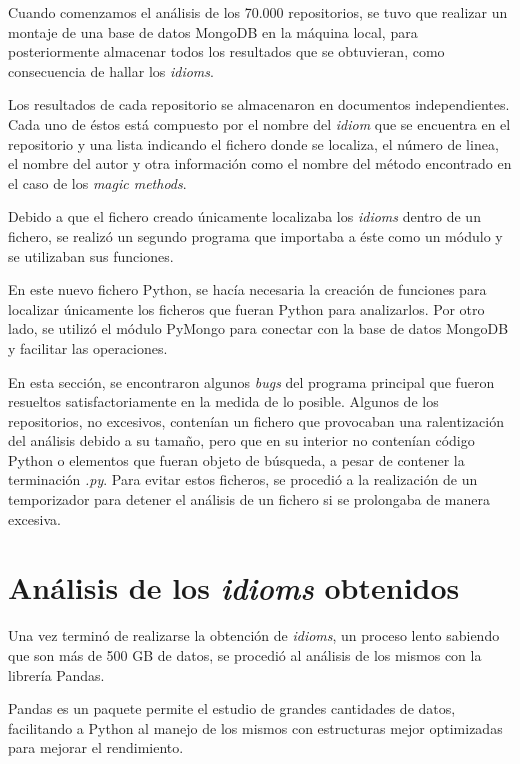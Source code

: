 \documentclass[a4paper, 12pt]{book}
\begin{document}
Cuando comenzamos el análisis de los 70.000 repositorios, se tuvo que realizar un montaje de una base de datos MongoDB en la máquina local, para posteriormente almacenar todos los resultados que se obtuvieran, como consecuencia de hallar los \textit{idioms}.

Los resultados de cada repositorio se almacenaron en documentos independientes. Cada uno de éstos está compuesto por el nombre del \textit{idiom} que se encuentra en el repositorio y una lista indicando el fichero donde se localiza, el número de linea, el nombre del autor y otra información como el nombre del método encontrado en el caso de los \textit{magic methods}.

Debido a que el fichero creado únicamente localizaba los \textit{idioms} dentro de un fichero, se realizó un segundo programa que importaba a éste como un módulo y se utilizaban sus funciones.

En este nuevo fichero Python, se hacía necesaria la creación de funciones para localizar únicamente los ficheros que fueran Python para analizarlos. Por otro lado, se utilizó el módulo PyMongo para conectar con la base de datos MongoDB y facilitar las operaciones.

En esta sección, se encontraron algunos \textit{bugs} del programa principal que fueron resueltos satisfactoriamente en la medida de lo posible. Algunos de los repositorios, no excesivos, contenían un fichero que provocaban una ralentización del análisis debido a su tamaño, pero que en su interior no contenían código Python o elementos que fueran objeto de búsqueda, a pesar de contener la terminación \textit{.py}. Para evitar estos ficheros, se procedió a la realización de un temporizador para detener el análisis de un fichero si se prolongaba de manera excesiva.



\section{Análisis de los \textit{idioms} obtenidos}
\label{sec:analyze_idioms}

Una vez terminó de realizarse la obtención de \textit{idioms}, un proceso lento sabiendo que son más de 500 GB de datos, se procedió al análisis de los mismos con la librería Pandas.

Pandas es un paquete permite el estudio de grandes cantidades de datos, facilitando a Python al manejo de los mismos con estructuras mejor optimizadas para mejorar el rendimiento.
\end{document}
